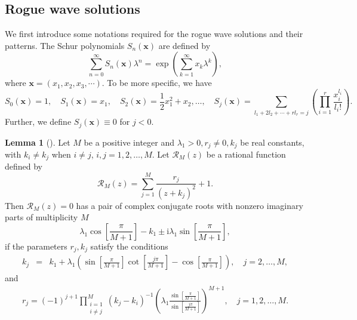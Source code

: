 \documentclass[preprint,3p,10pt]{elsarticle}
\theoremstyle{definition}
\newtheorem{lemma}{Lemma}[section]
\begin{document}
\subsection{Rogue wave solutions}
We first introduce some notations required for the rogue wave solutions and their patterns. 
The Schur polynomials $S_n(\mathbf{x})$ are defined by
\begin{equation} \sum_{n=0}^{\infty}S_n(\mathbf{x})\lambda^n=\exp\left(\sum_{k=1}^{\infty}x_k\lambda^k\right),
\end{equation}
where $\mathbf{x}=(x_1,x_2,x_3,\cdots)$. To be more specific, we have
\begin{equation}\label{Schur polynomials}
  S_{0}(\mathbf{x})=1, \quad S_{1}(\mathbf{x})=x_{1}, \quad S_{2}(\mathbf{x})=\frac{1}{2} x_{1}^{2}+x_{2},  \ldots, \quad S_{j}(\mathbf{x})=\sum_{l_{1}+2 l_{2}+\cdots+r l_{r}=j}\left(\prod_{i=1}^{r} \frac{x_{i}^{l_{i}}}{l_{i} !}\right).
\end{equation}
Further, we define $S_j(\mathbf{x})\equiv0$ for $ j<0 $.

\begin{lemma}[\cite{zhang2022rogue}]\label{lemma:multiple roots}
Let $M$ be a positive integer and $\lambda_1>0, r_j \not = 0,k_j$ be real constants, with $k_i\neq k_j$ when $i\neq j$, $i,j=1,2,\dots, M$. 
Let $\mathcal{R}_M(z)$ be a rational function defined by
\begin{equation}\label{dimension reduction VS rat}
\mathcal{R}_M(z)= \sum_{j=1}^M\frac{r_j }{(z+  k_j)^2} + 1.
\end{equation}
Then $\mathcal{R}_M(z)=0$ has a pair of complex conjugate roots with nonzero imaginary parts of multiplicity $M$
\begin{equation}
     \lambda_1  \cos\left[  \frac{\pi}{M+1}\right] -  k_1  \pm  \mathrm{i}  \lambda_1 \sin\left[  \frac{\pi}{M+1}\right],
\end{equation}
if the parameters  $r_j,k_j$ satisfy the conditions
\begin{eqnarray}
  k_j  &=& k_1 +  \lambda_1 \left( \sin\left[\frac{\pi}{M+1}\right]  \cot\left[\frac{j\pi}{M+1}\right] -  \cos\left[\frac{\pi}{M+1}\right]\right), \quad j=2,\dots, M,
\end{eqnarray}
and
\begin{eqnarray}
  r_j
  = (-1)^{j+1}  \prod_{\substack{i=1 \\ i \not=j}}^M (k_j-k_i)^{-1}  \left(\lambda_1 \frac{\sin\left[  \frac{\pi}{M+1}\right] }{\sin\left[\frac{j\pi}{M+1}\right]} \right)^{M+1},\quad j=1,2,\dots, M.
\end{eqnarray}




\end{lemma}
\end{document}
